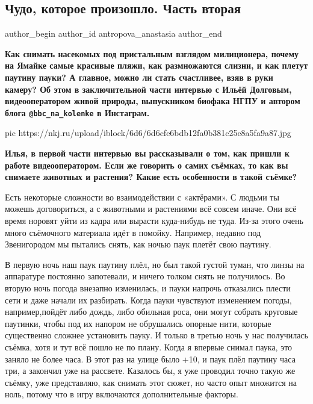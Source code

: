  
 
 
 
 
 
\subsection{Чудо, которое произошло. Часть вторая}
\label{sec:31_10_2020.sites.ru.nauka_i_zhizn.antropova_anastasia.1.chudo_chast_2}
\ifcmt
	author_begin
   author_id antropova_anastasia
	author_end
\fi

\begin{leftbar}
	\bfseries Как снимать насекомых под пристальным взглядом милиционера, почему
				на Ямайке самые красивые пляжи, как размножаются слизни, и как плетут
				паутину пауки? А главное, можно ли стать счастливее, взяв в руки
				камеру? Об этом в заключительной части интервью с Ильёй Долговым,
				видеооператором живой природы, выпускником биофака НГПУ и автором блога
				\verb|@bbc_na_kolenke| в Инстаграм.
\end{leftbar}

\ifcmt
pic https://nkj.ru/upload/iblock/6d6/6d6cfe6bdb12fa0b381c25e8a5fa9a87.jpg
\fi

\textbf{Илья, в первой части интервью вы рассказывали о том, как пришли к работе
видеооператором. Если же говорить о самих съёмках, то как вы снимаете животных
и растения? Какие есть особенности в такой съёмке?}

Есть некоторые сложности во взаимодействии с «актёрами». С людьми ты можешь
договориться, а с животными и растениями всё совсем иначе. Они всё время
норовят уйти из кадра или вырасти куда-нибудь не туда. Из-за этого очень много
съёмочного материала идёт в помойку. Например, недавно под Звенигородом мы
пытались снять, как ночью паук плетёт свою паутину.

В первую ночь наш паук паутину плёл, но был такой густой туман, что линзы на
аппаратуре постоянно запотевали, и ничего толком снять не получилось. Во вторую
ночь погода внезапно изменилась, и пауки напрочь отказались плести сети и даже
начали их разбирать. Когда пауки чувствуют изменением погоды, например,пойдёт
либо дождь, либо обильная роса, они могут собрать круговые паутинки, чтобы под
их напором не обрушались опорные нити, которые существенно сложнее установить
пауку. И только в третью ночь у нас получилась съёмка, хотя и тут всё пошло не
по плану. Когда я впервые снимал паука, это заняло не более часа. В этот раз на
улице было +10, и паук плёл паутину часа три, а закончил уже на рассвете.
Казалось бы, я уже проводил точно такую же съёмку, уже представляю, как снимать
этот сюжет, но часто опыт множится на ноль, потому что в игру включаются
дополнительные факторы.

